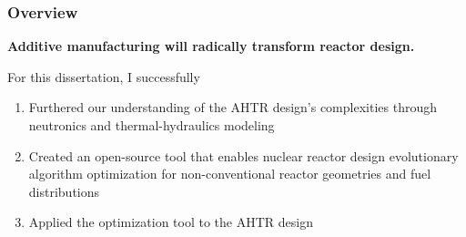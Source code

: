 \begin{frame}
    \frametitle{Overview}
    \textbf{Additive manufacturing will radically transform reactor design.}
    \vspace{0.5cm}

    For this dissertation, I successfully
    \begin{enumerate}
        \item Furthered our understanding of the \gls{AHTR} design's complexities 
        through neutronics and thermal-hydraulics modeling
        \item Created an open-source tool that enables nuclear reactor design 
        evolutionary algorithm optimization for non-conventional reactor geometries and fuel 
        distributions
        \item Applied the optimization tool to the \gls{AHTR} design 
    \end{enumerate}

\end{frame}